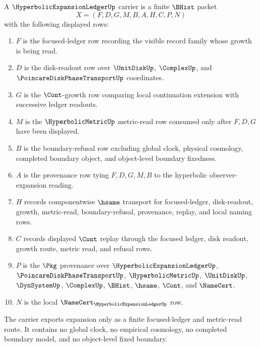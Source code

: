 \begin{definition}
\label{def:hyperbolic-expansion-ledger-carrier}
A $\HyperbolicExpansionLedgerUp$ carrier is a finite $\BHist$ packet
$$
X=(F,D,G,M,B,A,H,C,P,N)
$$
with the following displayed rows:
\begin{enumerate}
\item $F$ is the focused-ledger row recording the visible record family whose growth is being read.
\item $D$ is the disk-readout row over $\UnitDiskUp$, $\ComplexUp$, and $\PoincareDiskPhaseTransportUp$ coordinates.
\item $G$ is the $\Cont$-growth row comparing local continuation extension with successive ledger readouts.
\item $M$ is the $\HyperbolicMetricUp$ metric-read row consumed only after $F,D,G$ have been displayed.
\item $B$ is the boundary-refusal row excluding global clock, physical cosmology, completed boundary object, and object-level boundary fixedness.
\item $A$ is the provenance row tying $F,D,G,M,B$ to the hyperbolic observer-expansion reading.
\item $H$ records componentwise $\hsame$ transport for focused-ledger, disk-readout, growth, metric-read, boundary-refusal, provenance, replay, and local naming rows.
\item $C$ records displayed $\Cont$ replay through the focused ledger, disk readout, growth route, metric read, and refusal rows.
\item $P$ is the $\Pkg$ provenance over $\HyperbolicExpansionLedgerUp$, $\PoincareDiskPhaseTransportUp$, $\HyperbolicMetricUp$, $\UnitDiskUp$, $\DynSystemUp$, $\ComplexUp$, $\BHist$, $\hsame$, $\Cont$, and $\NameCert$.
\item $N$ is the local $\NameCert_{\HyperbolicExpansionLedgerUp}$ row.
\end{enumerate}
The carrier exports expansion only as a finite focused-ledger and metric-read route. It contains no global clock, no empirical cosmology, no completed boundary model, and no object-level fixed boundary.
\end{definition}

